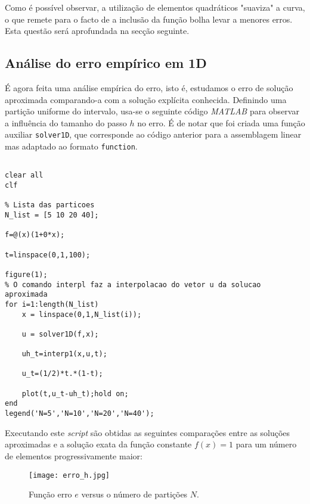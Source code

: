 \documentclass{article}
\theoremstyle{definition}
\theoremstyle{plain}
\numberwithin{equation}{section}
\newcommand{\tab}{\hspace{10mm}}
\begin{document}
Como é possível observar, a utilização de elementos quadráticos "suaviza" a curva, o que remete para o facto de a inclusão da função bolha levar a menores erros. Esta questão será aprofundada na secção seguinte.

\vspace{5mm}
\subsection{Análise do erro empírico em 1D}
\tab É agora feita uma análise empírica do erro, isto é, estudamos o erro de solução aproximada comparando-a com a solução explícita conhecida. Definindo uma partição uniforme do intervalo, usa-se o seguinte código \emph{MATLAB} para observar a influência do tamanho do passo $h$ no erro. É de notar que foi criada uma função auxiliar \verb +solver1D+, que corresponde ao código anterior para a assemblagem linear mas adaptado ao formato \verb+function+.

\vspace{5mm}

\begin{lstlisting}[frame=single]
% Codigo adaptado do Professor Antti Hannukainen da Universidade de Aalto [1]

clear all
clf

% Lista das particoes
N_list = [5 10 20 40];

f=@(x)(1+0*x);

t=linspace(0,1,100);

figure(1);
% O comando interpl faz a interpolacao do vetor u da solucao aproximada
for i=1:length(N_list)
    x = linspace(0,1,N_list(i));

    u = solver1D(f,x);

    uh_t=interp1(x,u,t);

    u_t=(1/2)*t.*(1-t);
    
    plot(t,u_t-uh_t);hold on;
end
legend('N=5','N=10','N=20','N=40');
\end{lstlisting}

\vspace{5mm}

Executando este \emph{script} são obtidas as seguintes comparações entre as soluções aproximadas e a solução exata da função constante $f(x)=1$ para um número de elementos progressivamente maior:


\begin{figure}[H]
\centering
\texttt{[image: erro\_h.jpg]}
\caption{Função erro $e$ versus o número de partições $N$.}
\end{figure}
\end{document}

